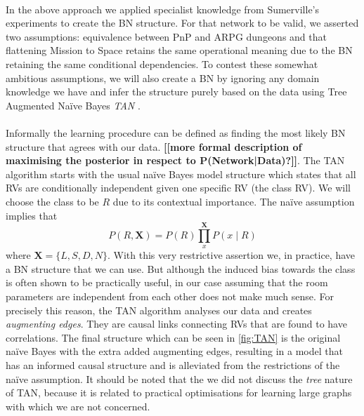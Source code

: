 \documentclass{UoYCSproject}
\begin{document}
\paragraph{}
In the above approach we applied specialist knowledge from Sumerville's experiments to create the BN structure. For that network to be valid, we asserted two assumptions: equivalence between PnP and ARPG dungeons and that flattening Mission to Space retains the same operational meaning due to the BN retaining the same conditional dependencies. To contest these somewhat ambitious assumptions, we will also create a BN by ignoring any domain knowledge we have and infer the structure purely based on the data using Tree Augmented Na\"{i}ve Bayes \textit{TAN} \parencite{FriedmanTAN}.  
\paragraph{}
Informally the learning procedure can be defined as finding the most likely BN structure that agrees with our data. \textbf{[[more formal description of maximising the posterior in respect to P(Network|Data)?]]}. The TAN algorithm starts with the usual na\"{i}ve Bayes model structure which states that all RVs are conditionally independent given one specific RV (the class RV). We will choose the class to be \(R\) due to its contextual importance. The na\"{i}ve assumption implies that \[P(R,\boldsymbol X) = P(R)\prod_{x}^{\boldsymbol X} P(x \mid R)\] where \(\boldsymbol X = \{L, S, D, N\}\). With this very restrictive assertion we, in practice, have a BN structure that we can use. But although the induced bias towards the class is often shown to be practically useful, in our case assuming that the room parameters are independent from each other does not make much sense. For precisely this reason, the TAN algorithm analyses our data and creates \textit{augmenting edges}. They are causal links connecting RVs that are found to have correlations. The final structure which can be seen in \ref{fig:TAN} is the original na\"{i}ve Bayes with the extra added augmenting edges, resulting in a model that has an informed causal structure and is alleviated from the restrictions of the na\"{i}ve assumption. It should be noted that the we did not discuss the \textit{tree} nature of TAN, because it is related to practical optimisations for learning large graphs with which we are not concerned.
\end{document}
